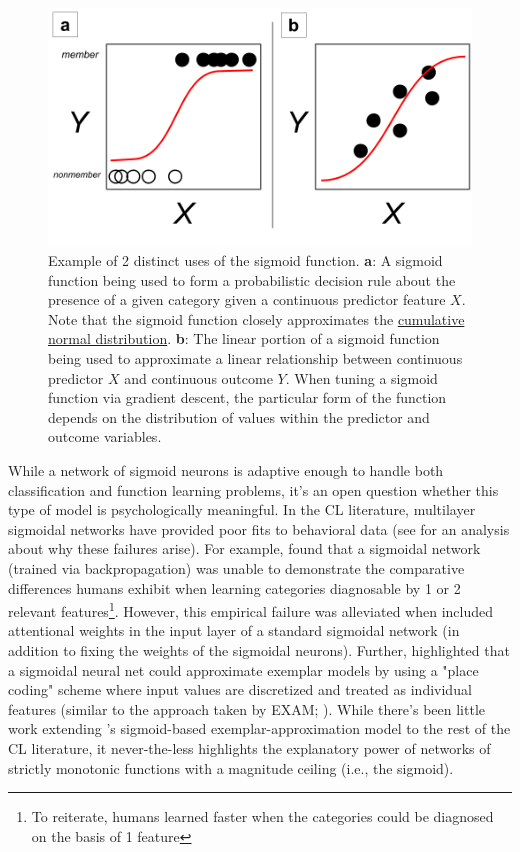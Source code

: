 \documentclass[12pt]{article}
\let\oldcite=\cite
\let\oldtextcite=\textcite
\renewcommand{\cite}[1]{\textcolor[rgb]{0, .121, .388}{\oldcite{#1}}}
\renewcommand{\textcite}[1]{\textcolor[rgb]{0, .121, .388}{\oldtextcite{#1}}}
\begin{document}
\begin{figure}[H]
    \centering
    \includegraphics[scale=.4]{figures/sigmoid.png}
    \caption{Example of 2 distinct uses of the sigmoid function. \textbf{a}: A sigmoid function being used to form a probabilistic decision rule about the presence of a given category given a continuous predictor feature $X$. Note that the sigmoid function closely approximates the \href{https://en.wikipedia.org/wiki/Normal_distribution}{cumulative normal distribution}. \textbf{b}: The linear portion of a sigmoid function being used to approximate a linear relationship between continuous predictor $X$ and continuous outcome $Y$. When tuning a sigmoid function via gradient descent, the particular form of the function depends on the distribution of values within the predictor and outcome variables.}
    \label{fig:sigmoid}
\end{figure} 	

While a network of sigmoid neurons is adaptive enough to handle both classification and function learning problems, it's an open question whether this type of model is psychologically meaningful. In the CL literature, multilayer sigmoidal networks have provided poor fits to behavioral data (see \cite{kruschke1993human} for an analysis about why these failures arise). For example, \textcite{kruschke1993human} found that a sigmoidal network (trained via backpropagation) was unable to demonstrate the comparative differences humans exhibit when learning categories diagnosable by 1 or 2 relevant features\footnote{To reiterate, humans learned faster when the categories could be diagnosed on the basis of 1 feature}. However, this empirical failure was alleviated when \textcite{kruschke1993human} included attentional weights in the input layer of a standard sigmoidal network (in addition to fixing the weights of the sigmoidal neurons). Further, \textcite{kruschke1993human} highlighted that a sigmoidal neural net could approximate exemplar models by using a "place coding" scheme where input values are discretized and treated as individual features (similar to the approach taken by EXAM; \cite{busemeyer1997learning}). While there's been little work extending \textcite{kruschke1993human}'s sigmoid-based exemplar-approximation model to the rest of the CL literature, it never-the-less highlights the explanatory power of networks of strictly monotonic functions with a magnitude ceiling (i.e., the sigmoid).
\end{document}
